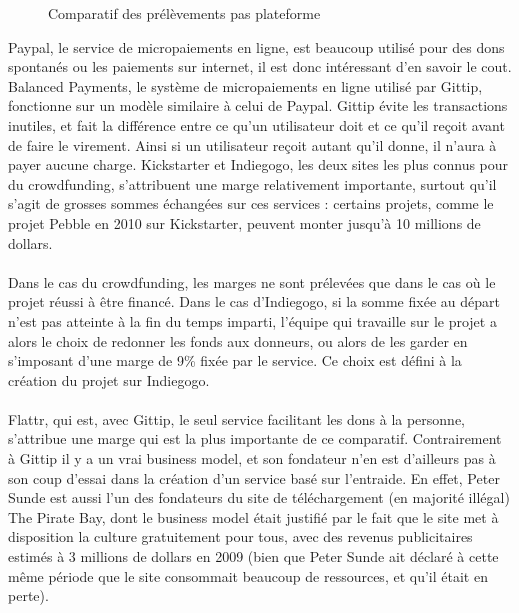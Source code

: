 \begin{figure}[h!]
    \caption{Comparatif des prélèvements pas plateforme}
\end{figure}

Paypal, le service de micropaiements en ligne,  est beaucoup utilisé pour des
dons spontanés ou les paiements sur internet, il est donc intéressant d'en
savoir le cout. Balanced Payments, le système de micropaiements en ligne utilisé
par Gittip, fonctionne sur un modèle similaire à celui de Paypal. Gittip évite
les transactions inutiles, et fait la différence entre ce qu'un utilisateur
doit et ce qu'il reçoit avant de faire le virement. Ainsi si un utilisateur
reçoit autant qu'il donne, il n'aura à payer aucune charge. Kickstarter et
Indiegogo, les deux sites les plus connus pour du crowdfunding, s'attribuent
une marge relativement importante, surtout qu'il s'agit de grosses sommes
échangées sur ces services : certains projets, comme le projet Pebble en 2010
sur Kickstarter, peuvent monter jusqu'à 10 millions de dollars.

\paragraph{}
Dans le cas du crowdfunding, les marges ne sont prélevées que dans le cas où le
projet réussi à être financé. Dans le cas d'Indiegogo, si la somme fixée au
départ n'est pas atteinte à la fin du temps imparti, l'équipe qui travaille sur
le projet a alors le choix de redonner les fonds aux donneurs, ou alors de les
garder en s'imposant d'une marge de 9\%{} fixée par le service. Ce choix est
défini à la création du projet sur Indiegogo.

\paragraph{}
Flattr, qui est, avec Gittip, le seul service facilitant les dons à la
personne, s'attribue une marge qui est la plus importante de ce comparatif.
Contrairement à Gittip il y a un vrai business model, et son fondateur n'en est
d'ailleurs pas à son coup d'essai dans la création d'un service basé sur
l'entraide. En effet, Peter Sunde est aussi l'un des fondateurs du site de
téléchargement (en majorité illégal) The Pirate Bay, dont le business model
était justifié par le fait que le site met à disposition la culture
gratuitement pour tous, avec des revenus publicitaires estimés à 3 millions de
dollars en 2009 (bien que Peter Sunde ait déclaré à cette même période que le
site consommait beaucoup de ressources, et qu'il était en perte).

